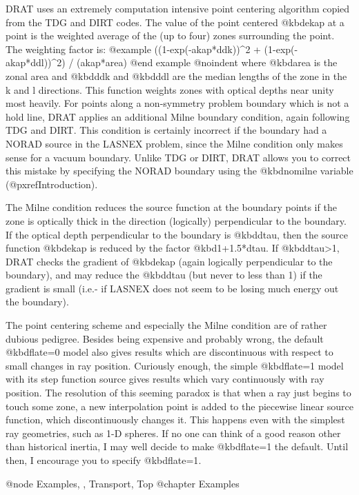 DRAT uses an extremely computation intensive point centering algorithm
copied from the TDG and DIRT codes.  The value of the point centered
@kbd{ekap} at a point is the weighted average of the (up to four) zones
surrounding the point.  The weighting factor is:
@example
((1-exp(-akap*ddk))^2 + (1-exp(-akap*ddl))^2) / (akap*area)
@end example
@noindent
where @kbd{area} is the zonal area and @kbd{ddk} and @kbd{ddl} are the
median lengths of the zone in the k and l directions.  This function
weights zones with optical depths near unity most heavily.  For points
along a non-symmetry problem boundary which is not a hold line, DRAT
applies an additional Milne boundary condition, again following TDG and
DIRT.  This condition is certainly incorrect if the boundary had a NORAD
source in the LASNEX problem, since the Milne condition only makes sense
for a vacuum boundary.  Unlike TDG or DIRT, DRAT allows you to correct
this mistake by specifying the NORAD boundary using the @kbd{nomilne}
variable (@pxref{Introduction}).

The Milne condition reduces the source function at the boundary points
if the zone is optically thick in the direction (logically) perpendicular
to the boundary.  If the optical depth perpendicular to the boundary is
@kbd{dtau}, then the source function @kbd{ekap} is reduced by the factor
@kbd{1+1.5*dtau}.  If @kbd{dtau>1}, DRAT checks the gradient of @kbd{ekap}
(again logically perpendicular to the boundary), and may reduce the
@kbd{dtau} (but never to less than 1) if the gradient is small (i.e.- if
LASNEX does not seem to be losing much energy out the boundary).

The point centering scheme and especially the Milne condition are of
rather dubious pedigree.  Besides being expensive and probably wrong,
the default @kbd{flate=0} model also gives results which are
discontinuous with respect to small changes in ray position.  Curiously
enough, the simple @kbd{flate=1} model with its step function source
gives results which vary continuously with ray position.  The resolution
of this seeming paradox is that when a ray just begins to touch some
zone, a new interpolation point is added to the piecewise linear source
function, which discontinuously changes it.  This happens even with the
simplest ray geometries, such as 1-D spheres.  If no one can think of a
good reason other than historical inertia, I may well decide to make
@kbd{flate=1} the default.  Until then, I encourage you to specify
@kbd{flate=1}.

@node Examples, , Transport, Top
@chapter Examples

